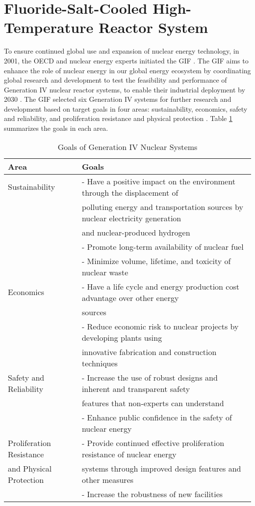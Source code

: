 \section{Fluoride-Salt-Cooled High-Temperature Reactor System}
\label{sec:fhr}
To ensure continued global use and expansion of nuclear energy technology, in 
2001, the \gls{OECD} and nuclear energy experts initiated the \gls{GIF} 
\cite{gif_technology_2002}.
The \gls{GIF} aims to enhance the role of nuclear energy in our global energy 
ecosystem by coordinating global research and development to test the 
feasibility and performance of Generation IV nuclear reactor systems, to enable 
their industrial deployment by 2030 \cite{gif_technology_2002}.
The \gls{GIF} selected six Generation IV systems for further research and 
development based on target goals in four areas: sustainability, 
economics, safety and reliability, and proliferation resistance and physical 
protection \cite{gif_technology_2002}. 
Table \ref{tab:goals-gen4} summarizes the goals in each area. 
\begin{table}[htb!]
    \centering
    \onehalfspacing
    \caption{Goals of Generation IV Nuclear Systems \cite{gif_technology_2002,
    behar_technology_2014}}
	\label{tab:goals-gen4}
    \footnotesize
    \begin{tabular}{l|l}
    \hline
                               \textbf{Area} & \textbf{Goals} \\ \hline
    Sustainability   & - Have a positive impact on the environment through the displacement of \\
    & polluting energy and transportation sources by nuclear electricity generation \\
    & and nuclear-produced hydrogen \\ 
    & - Promote long-term availability of nuclear fuel \\
    & - Minimize volume, lifetime, and toxicity of nuclear waste \\ \hline
    Economics & - Have a life cycle and energy production cost advantage over other energy \\
    & sources \\ 
    & - Reduce economic risk to nuclear projects by developing plants using \\
    & innovative fabrication and construction techniques \\ \hline
    Safety and Reliability   & - Increase the use of robust designs and inherent and transparent safety\\
    & features that non-experts can understand \\ 
    & - Enhance public confidence in the safety of nuclear energy \\\hline
    Proliferation Resistance & - Provide continued effective proliferation resistance of nuclear energy \\
    and Physical Protection & systems through improved design features and other measures \\ 
    & - Increase the robustness of new facilities \\ \hline
    \end{tabular}
\end{table}
